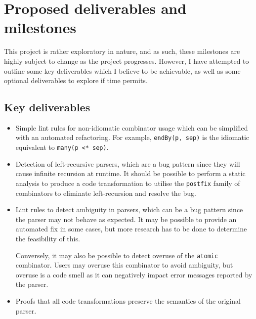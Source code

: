 \documentclass[../../main.tex]{subfiles}
\begin{document}

\section{Proposed deliverables and milestones}
This project is rather exploratory in nature, and as such, these milestones are highly subject to change as the project progresses.
However, I have attempted to outline some key deliverables which I believe to be achievable, as well as some optional deliverables to explore if time permits.

\subsection{Key deliverables}
\begin{itemize}
  \item
  Simple lint rules for non-idiomatic combinator usage which can be simplified with an automated refactoring.
  For example, \texttt{endBy(p, sep)} is the idiomatic equivalent to \texttt{many(p <* sep)}.
  \item
  Detection of left-recursive parsers, which are a bug pattern since they will cause infinite recursion at runtime.
  It should be possible to perform a static analysis to produce a code transformation to utilise the \texttt{postfix} family of combinators to eliminate left-recursion and resolve the bug.
  \item
  Lint rules to detect ambiguity in parsers, which can be a bug pattern since the parser may not behave as expected.
  It may be possible to provide an automated fix in some cases, but more research has to be done to determine the feasibility of this.

  Conversely, it may also be possible to detect overuse of the \texttt{atomic} combinator.
  Users may overuse this combinator to avoid ambiguity, but overuse is a code smell as it can negatively impact error messages reported by the parser.
  \item
  Proofs that all code transformations preserve the semantics of the original parser.
\end{itemize}
\end{document}
